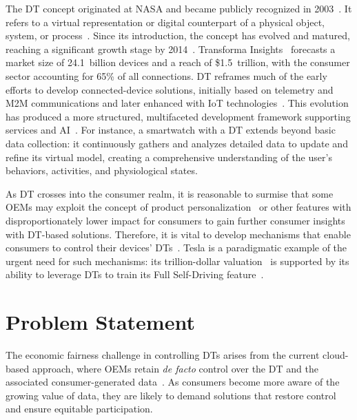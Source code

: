 The \ac{DT} concept originated at NASA and became publicly recognized in 2003~\cite{grieves:2014}.
It refers to a virtual representation or digital counterpart of a physical object, system, or process~\cite{minerva:lee:crespi:2020}.
Since its introduction, the concept has evolved and matured, reaching a significant growth stage by 2014~\cite{grieves:vickers:2017}.
Transforma Insights~\cite{transforma:insights:2021} forecasts a market size of 24.1~billion devices and a reach of \$1.5~trillion, with the consumer sector accounting for 65\% of all connections.
\ac{DT} reframes much of the early efforts to develop connected-device solutions, initially based on telemetry and \ac{M2M} communications and later enhanced with \ac{IoT} technologies~\cite{madakam:ramaswamy:tripathi:2015}.
This evolution has produced a more structured, multifaceted development framework supporting services and \ac{AI}~\cite{minerva:lee:crespi:2020}.
For instance, a smartwatch with a \ac{DT} extends beyond basic data collection: it continuously gathers and analyzes detailed data to update and refine its virtual model, creating a comprehensive understanding of the user's behaviors, activities, and physiological states.

As \ac{DT} crosses into the consumer realm, it is reasonable to surmise that some \acp{OEM} may exploit the concept of product personalization~\cite{thiesse:2007} or other features with disproportionately lower impact for consumers to gain further consumer insights with \ac{DT}-based solutions.
Therefore, it is vital to develop mechanisms that enable consumers to control their devices' \acp{DT}~\cite{kopponen:hahto:kettunen:etal:2022}.
Tesla is a paradigmatic example of the urgent need for such mechanisms: its trillion-dollar valuation~\cite{tesla:marketcap:2024} is supported by its ability to leverage \acp{DT} to train its Full Self-Driving feature~\cite{karpathy:matroid:2020,tesla:ai:day:2021}.

\section{Problem Statement}
\label{sec:problem}

\noindent The economic fairness challenge in controlling \acp{DT} arises from the current cloud-based approach, where \acp{OEM} retain \emph{de facto} control over the \ac{DT} and the associated consumer-generated data~\cite{hummel:braun:dabrock:2021}.
As consumers become more aware of the growing value of data, they are likely to demand solutions that restore control and ensure equitable participation.

